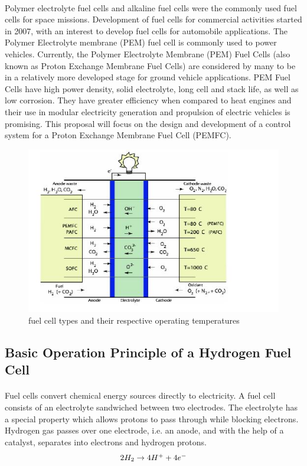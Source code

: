 \paragraph{}Polymer electrolyte fuel cells and alkaline fuel cells were the commonly used fuel cells for space missions. Development of fuel cells for commercial activities started in 2007, with an interest to develop fuel cells for automobile applications. The Polymer Electrolyte membrane (PEM) fuel cell is commonly used to power vehicles. Currently, the Polymer Electrolyte Membrane (PEM) Fuel Cells (also known as Proton Exchange Membrane Fuel Cells) are considered by many to be in a relatively more developed stage for ground vehicle applications. PEM Fuel Cells have high power density, solid electrolyte, long cell and stack life, as well as low corrosion. They have greater eﬃciency when compared to heat engines and their use in modular electricity generation and propulsion of electric vehicles is promising. This proposal will focus on the design and development of a control system for a Proton Exchange Membrane Fuel Cell (PEMFC).
\begin{figure}
\includegraphics{Figures/Figure1}
\caption{fuel cell types and their respective operating temperatures
\cite{stefanopoulou_mechatronics_nodate}}
\end{figure}
\subsection{Basic Operation Principle of a Hydrogen  Fuel Cell}
\paragraph{}Fuel cells convert chemical energy sources directly to electricity. A fuel cell consists of an electrolyte sandwiched between two electrodes. The electrolyte has a special property which allows protons to pass through while blocking electrons. Hydrogen gas passes over one electrode, i.e. an anode, and with the help of a catalyst, separates into electrons and hydrogen protons.
\begin{equation}
$$2H_{2}\rightarrow 4H^{+} + 4e^{-}$$
\end{equation}
